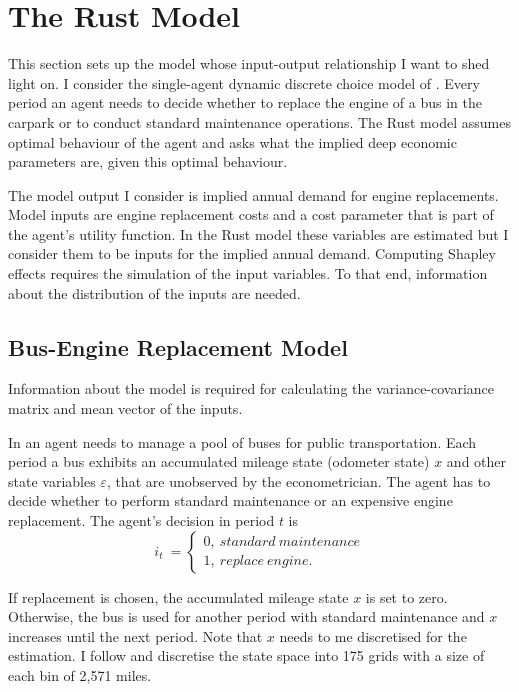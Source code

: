 \section{The Rust Model} \label{rust_model}

This section sets up the model whose input-output relationship I want to shed light on. I consider the single-agent dynamic discrete choice model of \citet{R87}. Every period an agent needs to decide whether to replace the engine of a bus in the carpark or to conduct standard maintenance operations. The Rust model assumes optimal behaviour of the agent and asks what the implied deep economic parameters are, given this optimal behaviour.

The model output I consider is implied annual demand for engine replacements. Model inputs are engine replacement costs and a cost parameter that is part of the agent’s utility function. In the Rust model these variables are estimated but I consider them to be inputs for the implied annual demand. Computing Shapley effects requires the simulation of the input variables. To that end, information about the distribution of the inputs are needed.

\subsection{Bus-Engine Replacement Model}

Information about the model is required for calculating the variance-covariance matrix and mean vector of the inputs.

In \citet{R87} an agent needs to manage a pool of buses for public transportation. Each period a bus exhibits an accumulated mileage state (odometer state) $x$ and other state variables $\varepsilon$, that are unobserved by the econometrician. The agent has to decide whether to perform standard maintenance or an expensive engine replacement. The agent’s decision in period $t$ is
\begin{equation}
i_t\ =
\begin{cases}
0,\ standard\ maintenance \\
1,\ replace\ engine.
\end{cases}
\end{equation}

\noindent If replacement is chosen, the accumulated mileage state $x$ is set to zero. Otherwise, the bus is used for another period with standard maintenance and $x$ increases until the next period. Note that $x$ needs to me discretised for the estimation. I follow \citet{R87} and discretise the state space into 175 grids with a size of each bin of 2,571 miles.

